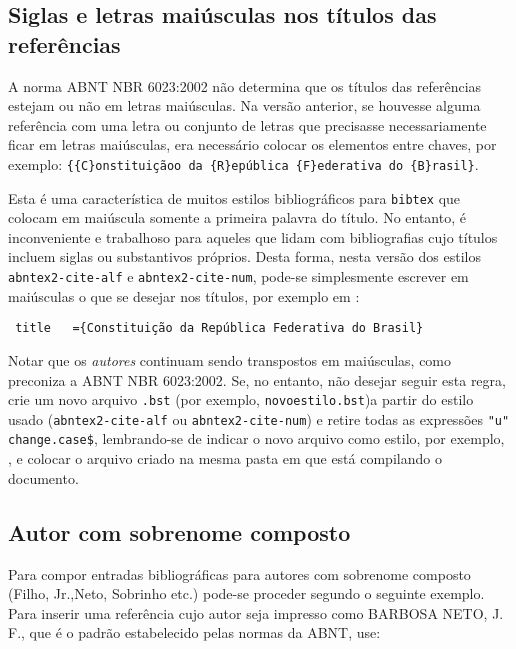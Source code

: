 \documentclass[a4paper]{ltxdoc}
\begin{document}
\subsection{Siglas e letras maiúsculas nos títulos das referências}

A norma ABNT NBR 6023:2002 não determina que os títulos das
referências estejam ou não em letras maiúsculas. Na versão anterior, se houvesse alguma referência
com uma letra ou conjunto de letras que precisasse necessariamente ficar em letras maiúsculas, era necessário
colocar os elementos entre chaves, por exemplo: \verb|{{C}onstituiçãoo da {R}epública {F}ederativa do {B}rasil}|.

Esta é uma característica de muitos estilos bibliográficos para \verb|bibtex| que colocam 
em maiúscula somente a primeira palavra do título. No entanto, é inconveniente e trabalhoso para aqueles que lidam com bibliografias cujo títulos incluem siglas ou substantivos próprios. Desta forma, nesta versão dos estilos \verb|abntex2-cite-alf| e \verb|abntex2-cite-num|,
pode-se simplesmente escrever em maiúsculas o que se desejar nos títulos, por exemplo em \cite{brasil1988}:

\begin{verbatim}
 title   ={Constituição da República Federativa do Brasil}
\end{verbatim}

Notar que os \textit{autores} continuam sendo transpostos em maiúsculas, como preconiza a ABNT NBR 6023:2002. Se, no entanto, não desejar seguir esta regra, crie um novo arquivo \verb|.bst| (por exemplo, \verb|novoestilo.bst|)a partir do estilo usado (\verb|abntex2-cite-alf| ou \verb|abntex2-cite-num|) e retire todas as expressões \verb|"u" change.case$|, lembrando-se de indicar o novo arquivo como estilo, por exemplo, \verb||, e colocar o arquivo criado na mesma pasta em que está compilando o documento.



\subsection{Autor com sobrenome composto}

Para compor entradas bibliográficas para autores com sobrenome composto (Filho, Jr.,Neto, Sobrinho etc.) pode-se proceder segundo o seguinte exemplo.
Para inserir uma referência cujo autor seja impresso como BARBOSA NETO, J. F., que é o padrão estabelecido pelas normas da ABNT, use:
\end{document}

